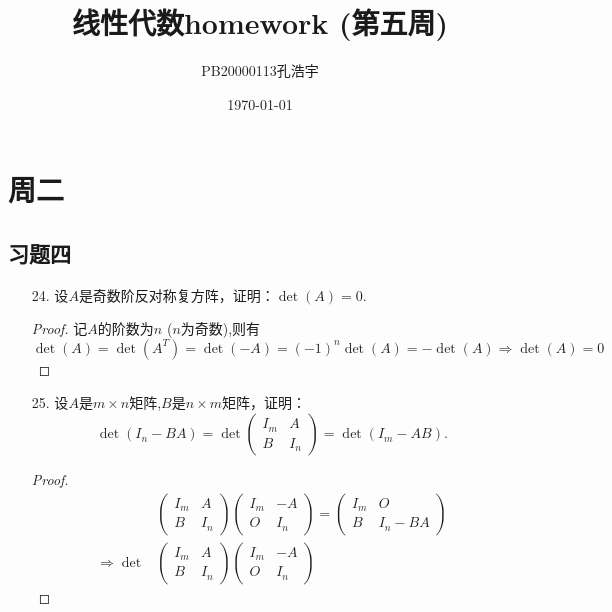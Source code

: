 \documentclass{article}
\title{线性代数homework (第五周)}
\author{PB20000113孔浩宇}
\date{\today}
\begin{document}
\maketitle
\section{周二}
\subsection{习题四}
\begin{enumerate}
    \item [24.]设$A$是奇数阶反对称复方阵，证明：$\det(A)=0$.
    \begin{proof}
        记$A$的阶数为$n$ ($n$为奇数),则有
        \[\det(A)=\det(A^T)=\det(-A)={(-1)}^{n}\det(A)=-\det(A) \Rightarrow \det(A)=0\]
    \end{proof}
    \item [25.]设$A$是$m\times n$矩阵,$B$是$n\times m$矩阵，证明：
    \[
        \det(I_n -BA)
        =\det
        \begin{pmatrix}
            I_m & A\\
            B & I_n
        \end{pmatrix}
        =\det(I_m-AB).
    \]
    \begin{proof}
        \begin{align*}
            &\begin{pmatrix}
                I_m & A\\
                B & I_n
            \end{pmatrix}
            \begin{pmatrix}
                I_m & -A\\
                O & I_n
            \end{pmatrix}
            =\begin{pmatrix}
                I_m & O\\
                B & I_n-BA
            \end{pmatrix}\\
            \Rightarrow
            \det&\begin{pmatrix}
                I_m & A\\
                B & I_n
            \end{pmatrix}
            \begin{pmatrix}
                I_m & -A\\
                O & I_n
            \end{pmatrix}

\end{align*}
\end{proof}
\end{enumerate}
\end{document}
